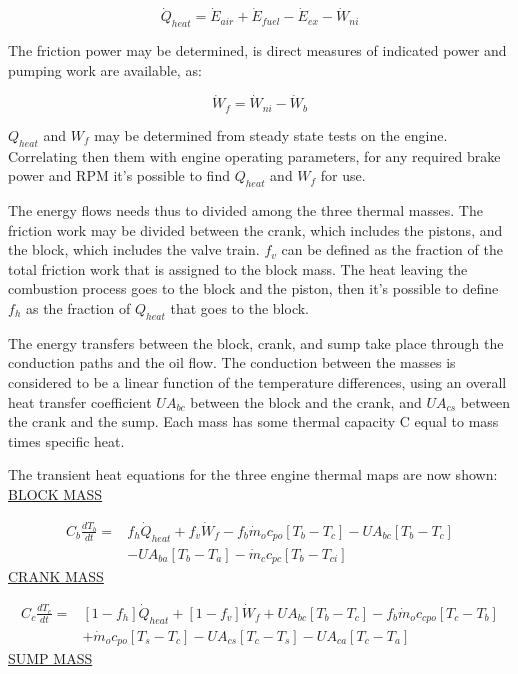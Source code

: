 \begin{equation}
  \dot{Q}_{heat} = \dot{E}_{air}+\dot{E}_{fuel}-\dot{E}_{ex}-\dot{W}_{ni}
\end{equation}

The friction power may be determined, is direct measures of indicated power and pumping work are available, as:

\begin{equation}
  \dot{W}_{f}=\dot{W}_{ni}-\dot{W}_{b}
\end{equation}

$Q_{heat}$ and $W_{f}$ may be determined from steady state tests on the engine. Correlating then them with engine operating parameters, for any required brake power and RPM it's possible to find $Q_{heat}$ and $W_{f}$ for use.

The energy flows needs thus to divided among the three thermal masses. The friction work may be divided between the crank, which includes the pistons, and the block, which includes the valve train. $f_{v}$ can be defined as the fraction of the total friction work that is assigned to the block mass. The heat leaving the combustion process goes to the block and the piston, then it's possible to define $f_{h}$ as the fraction of $Q_{heat}$ that goes to the block.

The energy transfers between the block, crank, and sump take place through the conduction paths and the oil flow. The conduction between the masses is considered to be a linear function of the temperature differences, using an overall heat transfer coefficient $UA_{bc}$ between the block and the crank, and $UA_{cs}$ between the crank and the sump. Each mass has some thermal capacity C equal to mass times specific heat.

The transient heat equations for the three engine thermal maps are now shown:
\uline{BLOCK MASS}

\begin{equation}
  \begin{split}
    C_{b}\frac{dT_{b}}{dt}  = &f_{h}\dot{Q}_{heat} + f_{v}\dot{W}_f - f_b\dot{m}_oc_{po}[T_b-T_c]  - UA_{bc}[T_b-T_c] \\
    &- UA_{ba}[T_b-T_a] - \dot{m}_cc_{pc}[T_b-T_{ci}]
  \end{split}
\end{equation}
\uline{CRANK MASS}

\begin{equation}
  \begin{split}
    C_c \frac{dT_c}{dt} = &[1-f_h]\dot{Q}_{heat} + [1-f_v]\dot{W}_f + UA_{bc}[T_b-T_c]-f_b\dot{m}_oc_{cpo}[T_c-T_b] \\
    &+\dot{m}_oc_{po}[T_s-T_c] - UA_{cs}[T_c-T_s] - UA_{ca}[T_c-T_a]
  \end{split}
\end{equation}
\uline{SUMP MASS}

